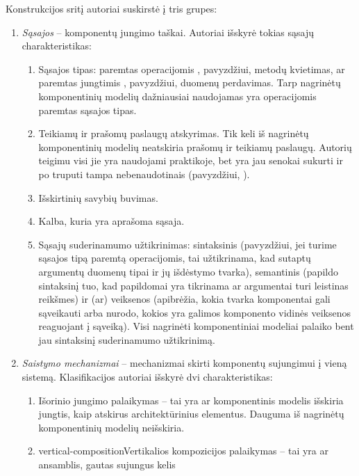 Konstrukcijos sritį autoriai suskirstė į tris grupes:
\begin{enumerate}
  \item \emph{Sąsajos}  – komponentų jungimo taškai.
    Autoriai išskyrė tokias sąsajų charakteristikas:
    \begin{enumerate}
      \item Sąsajos tipas: paremtas operacijomis ,
        pavyzdžiui, metodų kvietimas, ar paremtas jungtimis
        , pavyzdžiui, duomenų perdavimas. Tarp nagrinėtų
        komponentinių modelių dažniausiai naudojamas yra operacijomis
        paremtas sąsajos tipas.
      \item Teikiamų ir prašomų paslaugų atskyrimas. Tik keli iš
        nagrinėtų komponentinių modelių neatskiria prašomų ir
        teikiamų paslaugų. Autorių teigimu visi jie yra naudojami
        praktikoje, bet yra jau senokai sukurti ir po truputi tampa
        nebenaudotinais (pavyzdžiui, ).
      \item Išskirtinių savybių buvimas.
      \item Kalba, kuria yra aprašoma sąsaja.
      \item Sąsajų suderinamumo užtikrinimas: sintaksinis (pavyzdžiui,
        jei turime sąsajos tipą paremtą operacijomis, tai
        užtikrinama, kad sutaptų argumentų duomenų tipai ir jų
        išdėstymo tvarka), semantinis (papildo sintaksinį tuo, kad
        papildomai yra tikrinama ar argumentai turi leistinas reikšmes)
        ir (ar) veiksenos (apibrėžia, kokia tvarka komponentai gali
        sąveikauti arba nurodo, kokios yra galimos komponento vidinės
        veiksenos reaguojant į sąveiką). Visi nagrinėti
        komponentiniai modeliai palaiko bent jau sintaksinį
        suderinamumo užtikrinimą.
    \end{enumerate}
  \item \emph{Saistymo mechanizmai}  – mechanizmai
    skirti komponentų sujungimui į vieną sistemą. Klasifikacijos
    autoriai išskyrė dvi charakteristikas:
    \begin{enumerate}
      \item Išorinio jungimo palaikymas – tai yra ar komponentinis modelis
        išskiria jungtis, kaip atskirus architektūrinius elementus.
        Dauguma iš nagrinėtų komponentinių modelių neišskiria.
      \item \gls{vertical-composition}{Vertikalios kompozicijos}
        palaikymas – tai yra ar ansamblis, gautas sujungus kelis

\end{enumerate}
\end{enumerate}
